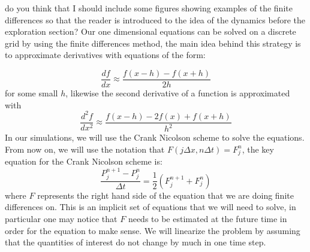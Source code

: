 {\color{red} do you think that I should include some figures showing examples of the finite differences so that the reader is introduced to the idea of the dynamics before the exploration section?}
Our one dimensional equations can be solved on a discrete grid by using the finite differences method, the main idea behind this strategy is to approximate derivatives with equations of the form:

\begin{equation}
\frac{d f}{d x} \approx \frac{f(x - h) - f(x + h)}{2h}
\end{equation}
for some small $h$, likewise the second derivative of a function is approximated with
\begin{equation}
\frac{d^2 f}{d x^2} \approx \frac{f(x - h) - 2f(x) + f(x + h)}{h^2}
\end{equation}
In our simulations, we will use the Crank Nicolson scheme \cite{Crank1996,Press2007} to solve the equations. From now on, we will use the notation that $F(j \Delta x, n \Delta t) = F_j^n$, the key equation for the Crank Nicolson scheme is:
\begin{equation}
\frac{P_j^{n+1} - P_j^n}{\Delta t} = \frac{1}{2}(F_j^{n+1} + F_j^n)
\end{equation}
where $F$ represents the right hand side of the equation that we are doing finite differences on. This is an implicit set of equations that we will need to solve, in particular one may notice that $F$ needs to be estimated at the future time in order for the equation to make sense. We will linearize the problem by assuming that the quantities of interest do not change by much in one time step.

